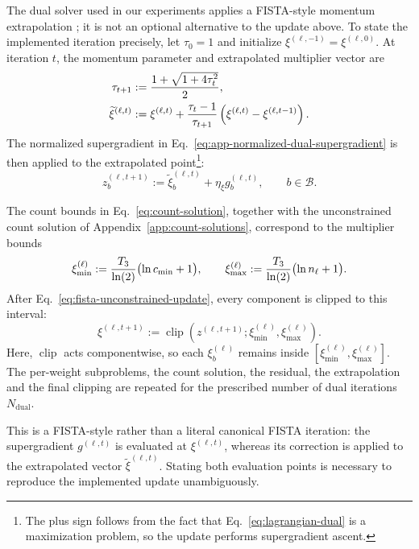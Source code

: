 \documentclass{article}
\begin{document}
The dual solver used in our experiments applies a FISTA-style momentum
extrapolation \citep{beck2009fista}; it is not an optional alternative to the
update above. To state the implemented iteration precisely, let $\tau_0=1$ and
initialize $\xi^{(\ell,-1)}=\xi^{(\ell,0)}$. At iteration $t$, the momentum
parameter and extrapolated multiplier vector are
\begin{align}
  \tau_{t+1}
  &:={1+\sqrt{1+4\tau_t^2}\over2},
  \label{eq:fista-momentum-parameter}\\
  \widetilde\xi^{(\ell,t)}
  &:={}
  \xi^{(\ell,t)}
  +{\tau_t-1\over\tau_{t+1}}
  \left(\xi^{(\ell,t)}-\xi^{(\ell,t-1)}\right).
  \label{eq:fista-extrapolated-multiplier}
\end{align}
The normalized supergradient in
Eq.~\eqref{eq:app-normalized-dual-supergradient} is then applied to the
extrapolated point\footnote{The plus sign follows from the fact that
Eq.~\eqref{eq:lagrangian-dual} is a maximization problem, so the update performs
supergradient ascent.}:
\begin{equation}
  z_b^{(\ell,t+1)}
  :=
  \widetilde\xi_b^{(\ell,t)}
  +\eta_\xi g_b^{(\ell,t)},
  \qquad b\in\mathcal B.
  \label{eq:fista-unconstrained-update}
\end{equation}

The count bounds in Eq.~\eqref{eq:count-solution}, together with
the unconstrained count solution of Appendix~\ref{app:count-solutions}, correspond to the
multiplier bounds
\begin{equation}
  \xi_{\min}^{(\ell)}
  :=
  {T_3\over\ln(2)}\bigl(\ln c_{\min}+1\bigr),
  \qquad
  \xi_{\max}^{(\ell)}
  :=
  {T_3\over\ln(2)}\bigl(\ln n_\ell+1\bigr).
  \label{eq:dual-multiplier-bounds}
\end{equation}
After Eq.~\eqref{eq:fista-unconstrained-update}, every component is clipped to
this interval:
\begin{equation}
  \xi^{(\ell,t+1)}
  :=
  \operatorname{clip}\!\left(
    z^{(\ell,t+1)};
    \xi_{\min}^{(\ell)},\xi_{\max}^{(\ell)}
  \right).
  \label{eq:fista-projected-update}
\end{equation}
Here, $\operatorname{clip}$ acts componentwise, so each $\xi_b^{(\ell)}$ remains
inside $[\xi_{\min}^{(\ell)},\xi_{\max}^{(\ell)}]$. The per-weight subproblems, the
count solution, the residual, the extrapolation and the final clipping are
repeated for the prescribed number of dual iterations $N_{\mathrm{dual}}$.

This is a FISTA-style rather than a literal canonical FISTA iteration: the
supergradient $g^{(\ell,t)}$ is evaluated at $\xi^{(\ell,t)}$, whereas its
correction is applied to the extrapolated vector
$\widetilde\xi^{(\ell,t)}$. Stating both evaluation points is necessary to
reproduce the implemented update unambiguously.
\end{document}
